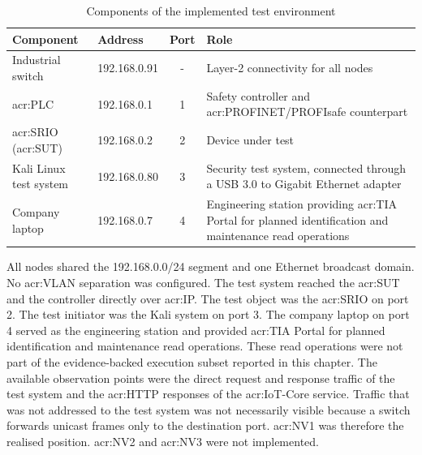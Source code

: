 \begin{table}[H]
	\centering
	\small
	\caption{Components of the implemented test environment}
	\label{tab:testbed_components}
	\begin{tabularx}{\textwidth}{l l c X}
		\toprule
		\textbf{Component} & \textbf{Address} & \textbf{Port} & \textbf{Role} \\
		\midrule
		Industrial switch & 192.168.0.91 & - & Layer-2 connectivity for all nodes \\
		\gls{acr:PLC}  & 192.168.0.1 & 1 & Safety controller and \gls{acr:PROFINET}/PROFIsafe counterpart \\
		\gls{acr:SRIO} (\gls{acr:SUT}) & 192.168.0.2 & 2 & Device under test \\
		Kali Linux test system & 192.168.0.80 & 3 & Security test system, connected through a USB 3.0 to Gigabit Ethernet adapter \\
		Company laptop & 192.168.0.7 & 4 & Engineering station providing \acrshort{acr:TIA} Portal for planned identification and maintenance read operations \\
		\bottomrule
	\end{tabularx}
\end{table}

All nodes shared the 192.168.0.0/24 segment and one Ethernet broadcast domain. No \gls{acr:VLAN} separation was configured. The test system reached the \gls{acr:SUT} and the controller directly over \gls{acr:IP}. The test object was the \gls{acr:SRIO} on port 2. The test initiator was the Kali system on port 3. The company laptop on port 4 served as the engineering station and provided \gls{acr:TIA} Portal for planned identification and maintenance read operations. These read operations were not part of the evidence-backed execution subset reported in this chapter. The available observation points were the direct request and response traffic of the test system and the \gls{acr:HTTP} responses of the \gls{acr:IoT}-Core service. Traffic that was not addressed to the test system was not necessarily visible because a switch forwards unicast frames only to the destination port. \gls{acr:NV1} was therefore the realised position. \gls{acr:NV2} and \gls{acr:NV3} were not implemented.

